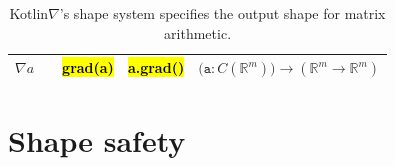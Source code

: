 \documentclass[12pt,initial,twoside,maitrise]{dms}
\newcommand{\inline}[1]{%
    \begingroup%
    \sethlcolor{slightgray}%
    \hl{\ttfamily\small #1}%
    \endgroup
}
\newcommand{\tinline}[1]{%
    \begingroup%
    \sethlcolor{slightgray}%
    \hl{\ttfamily\tiny #1}%
    \endgroup
}
\numberwithin{equation}{section}
\numberwithin{table}{chapter}
\numberwithin{figure}{chapter}
\begin{document}
{\begin{table}
\begin{tabular}{|c|c|c|c|l|}
               $\nabla a$                                      &                                                                                &  \tinline{grad(a)}                                                                       & \tinline{a.grad()}                                                                          & $                   \big(\texttt{a}: C(\mathbb{R}^{m})\big) \rightarrow (\mathbb{R}^{m}\rightarrow\mathbb{R}^{m})                                                                         $ \\ \hline
    \end{tabular}
\caption{\label{tab:shape_system}Kotlin$\nabla$'s shape system specifies the output shape for matrix arithmetic.}
\end{table}
}

\section{Shape safety}\label{sec:shape-safety}
\end{document}
